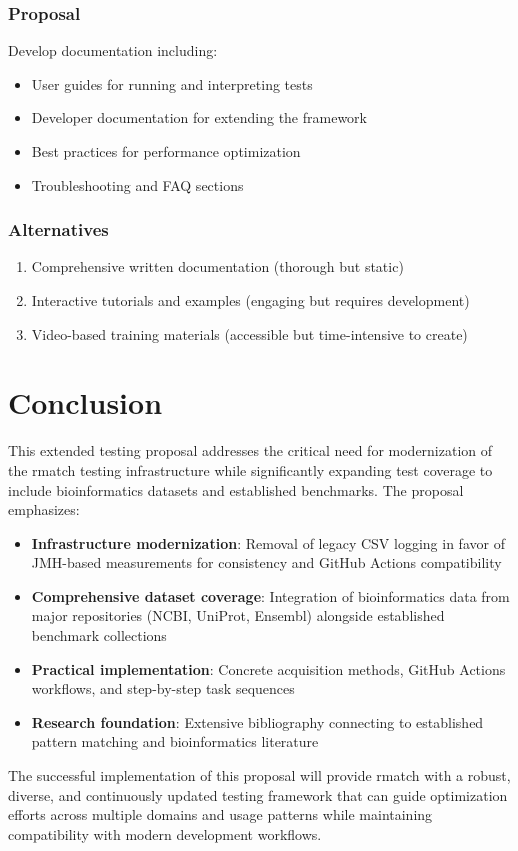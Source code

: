 \documentclass[11pt,a4paper]{article}
\begin{document}
\subsubsection{Proposal}
Develop documentation including:
\begin{itemize}
    \item User guides for running and interpreting tests
    \item Developer documentation for extending the framework
    \item Best practices for performance optimization
    \item Troubleshooting and FAQ sections
\end{itemize}

\subsubsection{Alternatives}
\begin{enumerate}
    \item Comprehensive written documentation (thorough but static)
    \item Interactive tutorials and examples (engaging but requires development)
    \item Video-based training materials (accessible but time-intensive to create)
\end{enumerate}

\newpage
\section{Conclusion}

This extended testing proposal addresses the critical need for modernization of the rmatch testing infrastructure while significantly expanding test coverage to include bioinformatics datasets and established benchmarks. The proposal emphasizes:

\begin{itemize}
    \item \textbf{Infrastructure modernization}: Removal of legacy CSV logging in favor of JMH-based measurements for consistency and GitHub Actions compatibility
    \item \textbf{Comprehensive dataset coverage}: Integration of bioinformatics data from major repositories (NCBI, UniProt, Ensembl) alongside established benchmark collections
    \item \textbf{Practical implementation}: Concrete acquisition methods, GitHub Actions workflows, and step-by-step task sequences
    \item \textbf{Research foundation}: Extensive bibliography connecting to established pattern matching and bioinformatics literature
\end{itemize}

The successful implementation of this proposal will provide rmatch with a robust, diverse, and continuously updated testing framework that can guide optimization efforts across multiple domains and usage patterns while maintaining compatibility with modern development workflows.



\end{document}
